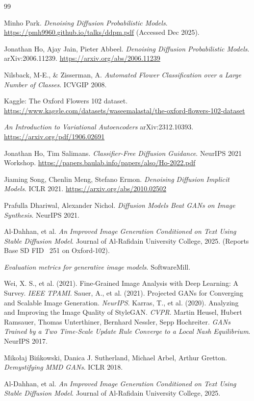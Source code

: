 \documentclass[12pt, a4paper]{article}
\begin{document}
\begin{thebibliography}{99}

Minho Park.
\newblock \textit{Denoising Diffusion Probabilistic Models}.
\newblock \url{https://pmh9960.github.io/talks/ddpm.pdf} (Accessed Dec 2025).

Jonathan Ho, Ajay Jain, Pieter Abbeel.
\newblock \textit{Denoising Diffusion Probabilistic Models}.
\newblock arXiv:2006.11239. \url{https://arxiv.org/abs/2006.11239}

Nilsback, M-E., \& Zisserman, A.
\newblock \textit{Automated Flower Classification over a Large Number of Classes}.
\newblock ICVGIP 2008.

Kaggle: The Oxford Flowers 102 dataset.
\newblock \url{https://www.kaggle.com/datasets/waseemalastal/the-oxford-flowers-102-dataset}

\textit{An Introduction to Variational Autoencoders}
\newblock arXiv:2312.10393. \url{https://arxiv.org/pdf/1906.02691}

Jonathan Ho, Tim Salimans.
\newblock \textit{Classifier-Free Diffusion Guidance}.
\newblock NeurIPS 2021 Workshop. \url{https://papers.baulab.info/papers/also/Ho-2022.pdf}

Jiaming Song, Chenlin Meng, Stefano Ermon.
\newblock \textit{Denoising Diffusion Implicit Models}.
\newblock ICLR 2021. \url{https://arxiv.org/abs/2010.02502}

Prafulla Dhariwal, Alexander Nichol.
\newblock \textit{Diffusion Models Beat GANs on Image Synthesis}.
\newblock NeurIPS 2021.

Al-Dahhan, et al.
\newblock \textit{An Improved Image Generation Conditioned on Text Using Stable Diffusion Model}.
\newblock Journal of Al-Rafidain University College, 2025. (Reports Base SD FID ~251 on Oxford-102).

\textit{Evaluation metrics for generative image models}.
\newblock SoftwareMill.


 Wei, X. S., et al. (2021). Fine-Grained Image Analysis with Deep Learning: A Survey. \textit{IEEE TPAMI}.
 Sauer, A., et al. (2021). Projected GANs for Converging and Scalable Image Generation. \textit{NeurIPS}.
 Karras, T., et al. (2020). Analyzing and Improving the Image Quality of StyleGAN. \textit{CVPR}.
Martin Heusel, Hubert Ramsauer, Thomas Unterthiner, Bernhard Nessler, Sepp Hochreiter.
\newblock \textit{GANs Trained by a Two Time-Scale Update Rule Converge to a Local Nash Equilibrium}.
\newblock NeurIPS 2017.

Mikołaj Bińkowski, Danica J. Sutherland, Michael Arbel, Arthur Gretton.
\newblock \textit{Demystifying MMD GANs}.
\newblock ICLR 2018.

Al-Dahhan, et al.
\newblock \textit{An Improved Image Generation Conditioned on Text Using Stable Diffusion Model}.
\newblock Journal of Al-Rafidain University College, 2025.

\end{thebibliography}
\end{document}
